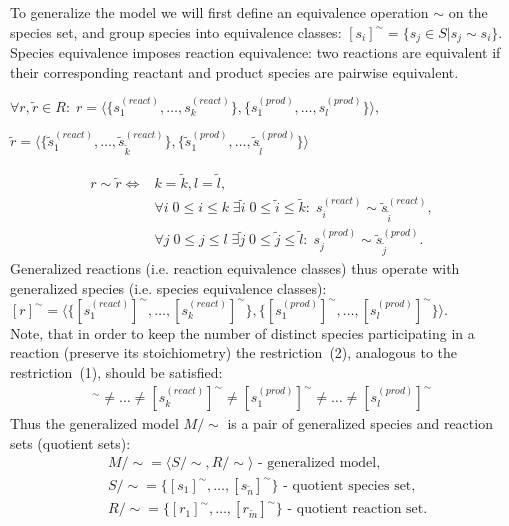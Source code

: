 \documentclass[10pt]{bmc_article}
\newenvironment{bmcformat}{\baselineskip20pt\sloppy\setboolean{publ}{false}}{\baselineskip20pt\sloppy}
\begin{document}
\begin{bmcformat}
To generalize the model we will first define an equivalence operation $\sim$ on the species set, and group species into equivalence classes: $[s_i]^{\sim} = \{s_j \in S | s_j \sim s_i\}$.\\
Species equivalence imposes reaction equivalence: two reactions are equivalent if their corresponding reactant and product species are pairwise equivalent.
\begin{center}
$\forall r, \tilde{r} \in R:\; r = \langle\{s^{(react)}_1, \ldots, s^{(react)}_k\},\{s^{(prod)}_1, \ldots, s^{(prod)}_l\}\rangle,$
\end{center}
\begin{center}
$\tilde{r} = \langle\{\tilde{s}^{(react)}_1, \ldots, \tilde{s}^{(react)}_{\tilde{k}}\},\{\tilde{s}^{(prod)}_1, \ldots, \tilde{s}^{(prod)}_{\tilde{l}}\}\rangle$
\end{center}
\begin{align*} 
r \sim \tilde{r} \iff & k = \tilde{k}, l = \tilde{l}, \\
& \forall i\; 0\leq{i}\leq{k} \; \exists \tilde{i}\; 0\leq \tilde{i}\leq \tilde{k}:\; s^{(react)}_i \sim \tilde{s}^{(react)}_{\tilde{i}},\\
& \forall j\;0\leq j\leq l\;\exists \tilde{j}\;0\leq \tilde{j}\leq\tilde{l}:\;s^{(prod)}_j \sim \tilde{s}^{(prod)}_{\tilde{j}}.
\end{align*}
Generalized reactions (i.e. reaction equivalence classes) thus operate with generalized species (i.e. species equivalence classes): 
$[r]^{\sim} = \langle\{[s^{(react)}_1]^{\sim}, \ldots, [s^{(react)}_k]^{\sim}\}, \{[s^{(prod)}_1]^{\sim}, \ldots, [s^{(prod)}_l]^{\sim}\}\rangle$.\\
Note, that in order to keep the number of distinct species participating in a reaction (preserve its stoichiometry) the restriction~(2), analogous to the restriction~(1), should be satisfied:
\begin{align}
[s^{(react)}_1]^{\sim} \neq \ldots \neq [s^{(react)}_k]^{\sim} \neq [s^{(prod)}_1]^{\sim} \neq \ldots \neq [s^{(prod)}_l]^{\sim}
\end{align}
Thus the generalized model $M/\sim$ is a pair of generalized species and reaction sets (quotient sets):
\begin{align*} 
&M/\sim = \langle S/\sim, R/\sim \rangle\text{ - generalized model},\\
&S/\sim = \{[s_1]^{\sim}, \ldots, [s_{\tilde{n}}]^{\sim}\}\text{ - quotient species set},\\
&R/\sim = \{[r_1]^{\sim}, \ldots, [r_{\tilde{m}}]^{\sim}\}\text{ - quotient reaction set}.

\end{align*}
\end{bmcformat}
\end{document}
